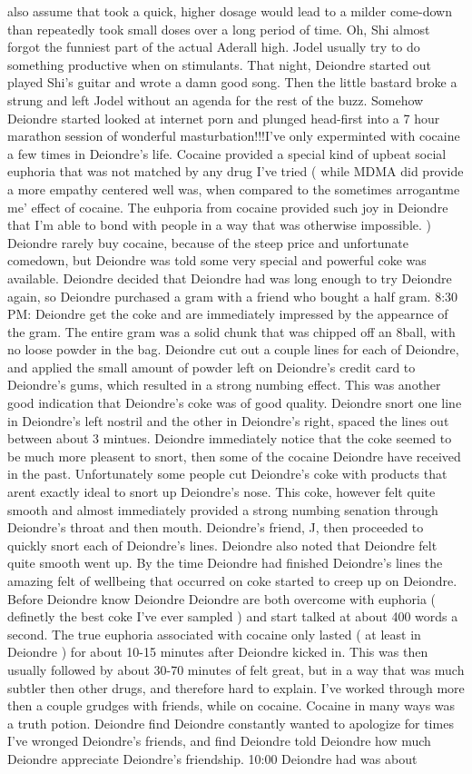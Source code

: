 \documentclass[12pt]{book}
\begin{document}
also assume that took a quick, higher dosage would lead to a milder come-down than repeatedly took small doses over a long period of time. Oh, Shi almost forgot the funniest part of the actual Aderall high. Jodel usually try to do something productive when on stimulants. That night, Deiondre started out played Shi's guitar and wrote a damn good song. Then the little bastard broke a strung and left Jodel without an agenda for the rest of the buzz. Somehow Deiondre started looked at internet porn and plunged head-first into a 7 hour marathon session of wonderful masturbation!!!I've only experminted with cocaine a few times in Deiondre's life. Cocaine provided a special kind of upbeat social euphoria that was not matched by any drug I've tried ( while MDMA did provide a more empathy centered well was, when compared to the sometimes arrogantme me' effect of cocaine. The euhporia from cocaine provided such joy in Deiondre that I'm able to bond with people in a way that was otherwise impossible. ) Deiondre rarely buy cocaine, because of the steep price and unfortunate comedown, but Deiondre was told some very special and powerful coke was available. Deiondre decided that Deiondre had was long enough to try Deiondre again, so Deiondre purchased a gram with a friend who bought a half gram. 8:30 PM: Deiondre get the coke and are immediately impressed by the appearnce of the gram. The entire gram was a solid chunk that was chipped off an 8ball, with no loose powder in the bag. Deiondre cut out a couple lines for each of Deiondre, and applied the small amount of powder left on Deiondre's credit card to Deiondre's gums, which resulted in a strong numbing effect. This was another good indication that Deiondre's coke was of good quality. Deiondre snort one line in Deiondre's left nostril and the other in Deiondre's right, spaced the lines out between about 3 mintues. Deiondre immediately notice that the coke seemed to be much more pleasent to snort, then some of the cocaine Deiondre have received in the past. Unfortunately some people cut Deiondre's coke with products that arent exactly ideal to snort up Deiondre's nose. This coke, however felt quite smooth and almost immediately provided a strong numbing senation through Deiondre's throat and then mouth. Deiondre's friend, J, then proceeded to quickly snort each of Deiondre's lines. Deiondre also noted that Deiondre felt quite smooth went up. By the time Deiondre had finished Deiondre's lines the amazing felt of wellbeing that occurred on coke started to creep up on Deiondre. Before Deiondre know Deiondre Deiondre are both overcome with euphoria ( definetly the best coke I've ever sampled ) and start talked at about 400 words a second. The true euphoria associated with cocaine only lasted ( at least in Deiondre ) for about 10-15 minutes after Deiondre kicked in. This was then usually followed by about 30-70 minutes of felt great, but in a way that was much subtler then other drugs, and therefore hard to explain. I've worked through more then a couple grudges with friends, while on cocaine. Cocaine in many ways was a truth potion. Deiondre find Deiondre constantly wanted to apologize for times I've wronged Deiondre's friends, and find Deiondre told Deiondre how much Deiondre appreciate Deiondre's friendship. 10:00 Deiondre had was about 
\end{document}
